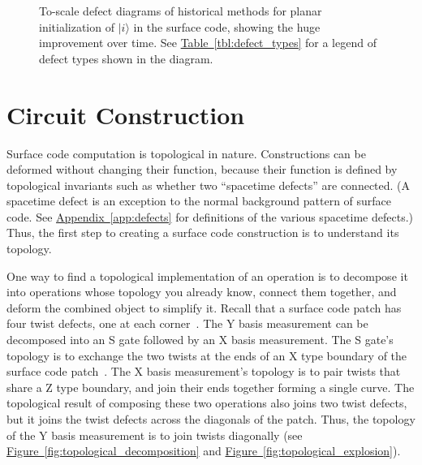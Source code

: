 \documentclass[onecolumn,unpublished,a4paper]{quantumarticle}
\theoremstyle{definition}
\theoremstyle{definition}
\theoremstyle{definition}
\DeclareRobustCommand{\app}[1]{\hyperref[app:#1]{Appendix~\ref*{app:#1}}}
\newcommand{\fig}[1]{\hyperref[fig:#1]{Figure~\ref*{fig:#1}}}
\newcommand{\tbl}[1]{\hyperref[tbl:#1]{Table~\ref*{tbl:#1}}}
\begin{document}
\begin{figure}
    \centering
    \caption{
    To-scale defect diagrams of historical methods for planar initialization of $|i\rangle$ in the surface code, showing the huge improvement over time.
    See \tbl{defect_types} for a legend of defect types shown in the diagram.
    }
    \label{fig:historical_progression}
\end{figure}





\section{Circuit Construction}
\label{sec:construction}

Surface code computation is topological in nature.
Constructions can be deformed without changing their function, because their function is defined by topological invariants such as whether two ``spacetime defects'' are connected.
(A spacetime defect is an exception to the normal background pattern of surface code.
See \app{defects} for definitions of the various spacetime defects.)
Thus, the first step to creating a surface code construction is to understand its topology.

One way to find a topological implementation of an operation is to decompose it into operations whose topology you already know, connect them together, and deform the combined object to simplify it.
Recall that a surface code patch has four twist defects, one at each corner~\cite{brown2017surfacetwists}.
The Y basis measurement can be decomposed into an S gate followed by an X basis measurement.
The S gate's topology is to exchange the two twists at the ends of an X type boundary of the surface code patch~\cite{brown2017surfacetwists}.
The X basis measurement's topology is to pair twists that share a Z type boundary, and join their ends together forming a single curve.
The topological result of composing these two operations also joins two twist defects, but it joins the twist defects across the diagonals of the patch.
Thus, the topology of the Y basis measurement is to join twists diagonally (see \fig{topological_decomposition} and \fig{topological_explosion}).
\end{document}
